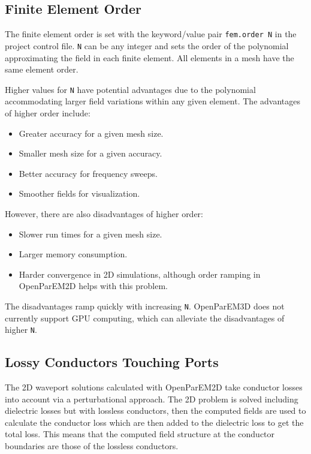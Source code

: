 \documentclass[titlepage]{article}
\renewcommand\_{\textunderscore\linebreak[1]}
\begin{document}
\subsection{Finite Element Order}

The finite element order is set with the keyword/value pair \texttt{fem.order N} in the project control file.  \texttt{N} can be any integer and sets the order of the polynomial approximating the field in each finite element.  All elements in a mesh have the same element order.

Higher values for \texttt{N} have potential advantages due to the polynomial accommodating larger field variations within any given element.  The advantages of higher order include:
\begin{itemize}
\item Greater accuracy for a given mesh size.
\item Smaller mesh size for a given accuracy.
\item Better accuracy for frequency sweeps.
\item Smoother fields for visualization.
\end{itemize}
\noindent However, there are also disadvantages of higher order:
\begin{itemize}
\item Slower run times for a given mesh size.
\item Larger memory consumption.
\item Harder convergence in 2D simulations, although order ramping in OpenParEM2D helps with this problem.
\end{itemize}
\noindent The disadvantages ramp quickly with increasing \texttt{N}.
OpenParEM3D does not currently support GPU computing, which can alleviate the disadvantages of higher \texttt{N}.

\subsection{Lossy Conductors Touching Ports}

The 2D waveport solutions calculated with OpenParEM2D take conductor losses into account via a perturbational approach. The 2D problem is solved including dielectric losses but with lossless conductors, then the computed fields are used to calculate the conductor loss which are then added to the dielectric loss to get the total loss.  This means that the computed field structure at the conductor boundaries are those of the lossless conductors.
\end{document}
